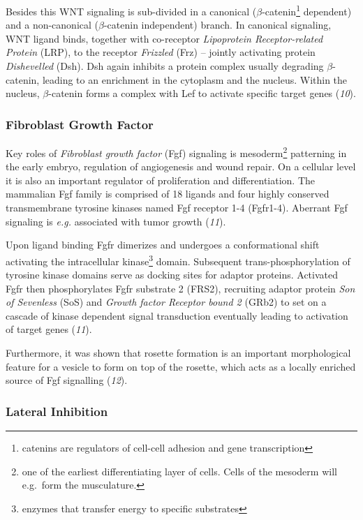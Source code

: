 \documentclass[11pt,singlespacinge,twoside]{reedthesis} %
\begin{document}
Besides this WNT signaling is sub-divided in a canonical (\(\beta\)-catenin\footnote{catenins are regulators of cell-cell adhesion and gene transcription} dependent) and a non-canonical (\(\beta\)-catenin independent) branch. In canonical signaling, WNT ligand binds, together with co-receptor \emph{Lipoprotein Receptor-related Protein} (LRP), to the receptor \emph{Frizzled} (Frz) -- jointly activating protein \emph{Dishevelled} (Dsh). Dsh again inhibits a protein complex usually degrading \(\beta\)-catenin, leading to an enrichment in the cytoplasm and the nucleus. Within the nucleus, \(\beta\)-catenin forms a complex with Lef to activate specific target genes (\emph{10}).

\hypertarget{fibroblast-growth-factor}{%
\subsubsection{Fibroblast Growth Factor}\label{fibroblast-growth-factor}}

Key roles of \emph{Fibroblast growth factor} (Fgf) signaling is mesoderm\footnote{one of the earliest differentiating layer of cells. Cells of the mesoderm will e.g.~form the musculature.} patterning in the early embryo, regulation of angiogenesis and wound repair. On a cellular level it is also an important regulator of proliferation and differentiation. The mammalian Fgf family is comprised of 18 ligands and four highly conserved transmembrane tyrosine kinases named Fgf receptor 1-4 (Fgfr1-4). Aberrant Fgf signaling is \emph{e.g.} associated with tumor growth (\emph{11}).

Upon ligand binding Fgfr dimerizes and undergoes a conformational shift activating the intracellular kinase\footnote{enzymes that transfer energy to specific substrates} domain. Subsequent trans-phosphorylation of tyrosine kinase domains serve as docking sites for adaptor proteins. Activated Fgfr then phosphorylates Fgfr substrate 2 (FRS2), recruiting adaptor protein \emph{Son of Sevenless} (SoS) and \emph{Growth factor Receptor bound 2} (GRb2) to set on a cascade of kinase dependent signal transduction eventually leading to activation of target genes (\emph{11}).

Furthermore, it was shown that rosette formation is an important morphological feature for a vesicle to form on top of the rosette, which acts as a locally enriched source of Fgf signalling (\emph{12}).

\hypertarget{intro-notch}{%
\subsubsection{Lateral Inhibition}\label{intro-notch}}
\end{document}
